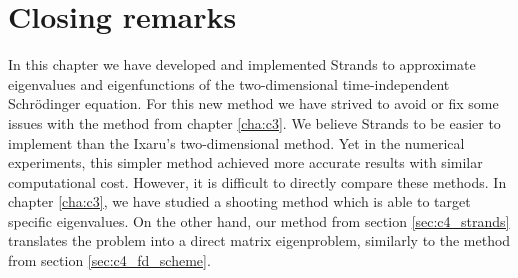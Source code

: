 





\section{Closing remarks}

In this chapter we have developed and implemented Strands to approximate eigenvalues and eigenfunctions of the two-dimensional time-independent Schrödinger equation. For this new method we have strived to avoid or fix some issues with the method from chapter \ref{cha:c3}. We believe Strands to be easier to implement than the Ixaru's two-dimensional method. Yet in the numerical experiments, this simpler method achieved more accurate results with similar computational cost. However, it is difficult to directly compare these methods. In chapter \ref{cha:c3}, we have studied a shooting method which is able to target specific eigenvalues. On the other hand, our method from section \ref{sec:c4_strands}  translates the problem into a direct matrix eigenproblem, similarly to the method from section \ref{sec:c4_fd_scheme}.

